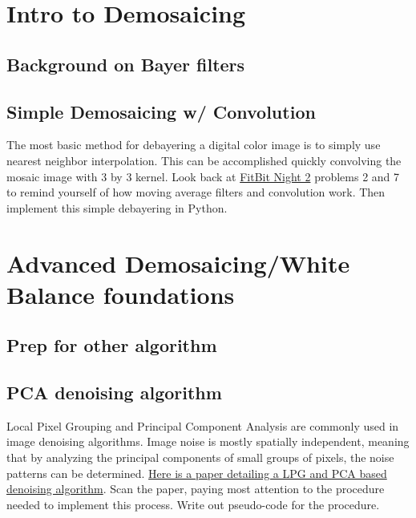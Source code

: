 \documentclass{tufte-handout}
\begin{document}
\section{Intro to Demosaicing}
\subsection{Background on Bayer filters}  %



\subsection{Simple Demosaicing w/ Convolution}
The most basic method for debayering a digital color image is to simply use nearest neighbor interpolation. This can be accomplished quickly convolving the mosaic image with 3 by 3 kernel. Look back at \href{https://drive.google.com/file/d/1_eEtwNDHhF-Izfcf6l00PvG-b6whwety/view}{FitBit Night 2} problems 2 and 7 to remind yourself of how moving average filters and convolution work. Then implement this simple debayering in Python. 


\section{Advanced Demosaicing/White Balance foundations}

\subsection{Prep for other algorithm}  %

\subsection{PCA denoising algorithm}  %
Local Pixel Grouping and Principal Component Analysis are commonly used in image denoising algorithms. Image noise is mostly spatially independent, meaning that by analyzing the principal components of small groups of pixels, the noise patterns can be determined. 
\href{https://www4.comp.polyu.edu.hk/~cslzhang/paper/PR_10_x_3.pdf}{Here is a paper detailing a LPG and PCA based denoising algorithm}. Scan the paper, paying most attention to the procedure needed to implement this process. Write out pseudo-code for the procedure. %
\end{document}
